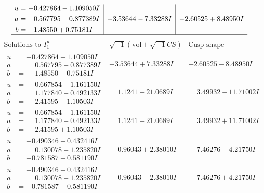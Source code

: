 \documentclass[1p]{elsarticle_modified}
\theoremstyle{definition}
\newcommand{\I}{\sqrt{-1}}
\begin{document}
$$\begin{array}{c|c|c}
\begin{aligned}
u &= -0.427864 + 1.109050 I \\
a &= \phantom{-}0.567795 + 0.877389 I \\
b &= \phantom{-}1.48550 + 0.75181 I\end{aligned}
 & -3.53644 - 7.33288 I & -2.60525 + 8.48950 I\\
 \hline 
 \end{array}$$\newpage$$\begin{array}{c|c|c}  
\text{Solutions to }I^u_{1}& \I (\text{vol} + \sqrt{-1}CS) & \text{Cusp shape}\\
 \hline 
\begin{aligned}
u &= -0.427864 - 1.109050 I \\
a &= \phantom{-}0.567795 - 0.877389 I \\
b &= \phantom{-}1.48550 - 0.75181 I\end{aligned}
 & -3.53644 + 7.33288 I & -2.60525 - 8.48950 I \\ \hline\begin{aligned}
u &= \phantom{-}0.667854 + 1.161150 I \\
a &= \phantom{-}1.177840 - 0.492133 I \\
b &= \phantom{-}2.41595 - 1.10503 I\end{aligned}
 & \phantom{-}1.1241 + 21.0689 I & \phantom{-}3.49932 - 11.71002 I \\ \hline\begin{aligned}
u &= \phantom{-}0.667854 - 1.161150 I \\
a &= \phantom{-}1.177840 + 0.492133 I \\
b &= \phantom{-}2.41595 + 1.10503 I\end{aligned}
 & \phantom{-}1.1241 - 21.0689 I & \phantom{-}3.49932 + 11.71002 I \\ \hline\begin{aligned}
u &= -0.490346 + 0.432416 I \\
a &= \phantom{-}0.130078 - 1.235820 I \\
b &= -0.781587 + 0.581190 I\end{aligned}
 & \phantom{-}0.96043 + 2.38010 I & \phantom{-}7.46276 - 4.21750 I \\ \hline\begin{aligned}
u &= -0.490346 - 0.432416 I \\
a &= \phantom{-}0.130078 + 1.235820 I \\
b &= -0.781587 - 0.581190 I\end{aligned}
 & \phantom{-}0.96043 - 2.38010 I & \phantom{-}7.46276 + 4.21750 I \\ \hline\begin{aligned}

\end{aligned}
\end{array}$$
\end{document}
